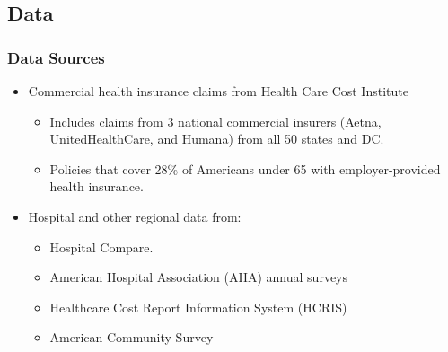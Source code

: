 \documentclass{beamer}
\begin{document}
\subsection{Data}

\begin{frame}
\frametitle{Data Sources}
\begin{itemize}
\item Commercial health insurance claims from Health Care Cost Institute
    \begin{itemize}
    \item Includes claims from 3 national commercial insurers (Aetna, UnitedHealthCare, and Humana) from all 50 states and DC. 
    \item Policies that cover 28$\%$ of Americans under 65 with employer-provided health insurance.
    \end{itemize}
\item Hospital and other regional data from:
    \begin{itemize}
    \item Hospital Compare.
    \item American Hospital Association (AHA) annual surveys
    \item Healthcare Cost Report Information System (HCRIS) 
    \item American Community Survey
    \end{itemize}
    \end{itemize}
\end{frame}
\end{document}
